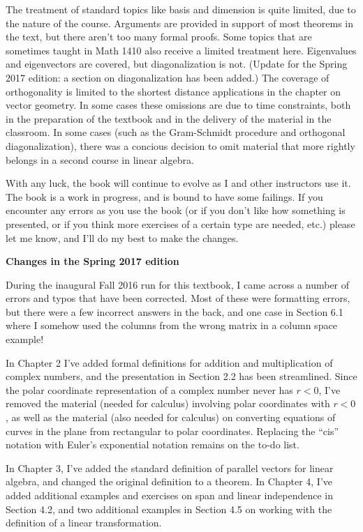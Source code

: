 The treatment of standard topics like basis and dimension is quite limited, due to the nature of the course. Arguments are provided in support of most theorems in the text, but there aren't too many formal proofs. Some topics that are sometimes taught in Math 1410 also receive a limited treatment here. Eigenvalues and eigenvectors are covered, but diagonalization is not. (Update for the Spring 2017 edition: a section on diagonalization has been added.) The coverage of orthogonality is limited to the shortest distance applications in the chapter on vector geometry. In some cases these omissions are due to time constraints, both in the preparation of the textbook and in the delivery of the material in the classroom. In some cases (such as the Gram-Schmidt procedure and orthogonal diagonalization), there was a concious decision to omit material that more rightly belongs in a second course in linear algebra.

With any luck, the book will continue to evolve as I and other instructors use it. The book is a work in progress, and is bound to have some failings. If you encounter any errors as you use the book (or if you don't like how something is presented, or if you think more exercises of a certain type are needed, etc.) please let me know, and I'll do my best to make the changes. 



\pagebreak

\noindent\textbf{\large Changes in the Spring 2017 edition}

During the inaugural Fall 2016 run for this textbook, I came across a number of errors and typos that have been corrected. Most of these were formatting errors, but there were a few incorrect answers in the back, and one case in Section 6.1 where I somehow used the columns from the wrong matrix in a column space example!

In Chapter 2 I've added formal definitions for addition and multiplication of complex numbers, and the presentation in Section 2.2 has been streamlined. Since the polar coordinate representation of a complex number never has $r<0$, I've removed the material (needed for calculus) involving polar coordinates with $r<0$, as well as the material (also needed for calculus) on converting equations of curves in the plane from rectangular to polar coordinates. Replacing the ``cis'' notation with Euler's exponential notation remains on the to-do list.

In Chapter 3, I've added the standard definition of parallel vectors for linear algebra, and changed the original definition to a theorem. In Chapter 4, I've added additional examples and exercises on span and linear independence in Section 4.2, and two additional examples in Section 4.5 on working with the definition of a linear transformation.

